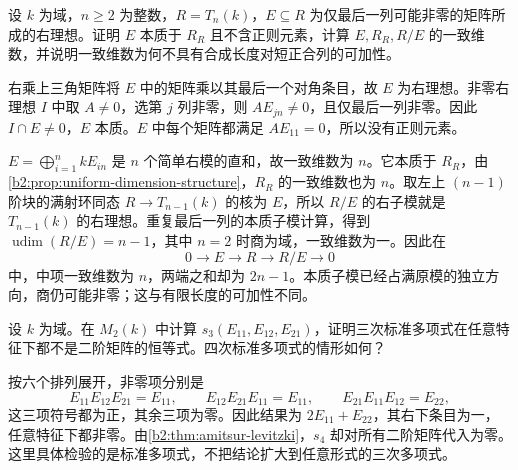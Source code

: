 \begin{optionalexercise}\label{b2:ex:19-essential-without-regular}
	设 \(k\) 为域，\(n\ge2\) 为整数，\(R=T_n(k)\)，\(E\subseteq R\) 为仅最后一列可能非零的矩阵所成的右理想。证明 \(E\) 本质于 \(R_R\) 且不含正则元素，计算 \(E,R_R,R/E\) 的一致维数，并说明一致维数为何不具有合成长度对短正合列的可加性。
\end{optionalexercise}
\begin{solution}
	右乘上三角矩阵将 \(E\) 中的矩阵乘以其最后一个对角条目，故 \(E\) 为右理想。非零右理想 \(I\) 中取 \(A\ne0\)，选第 \(j\) 列非零，则 \(AE_{jn}\ne0\)，且仅最后一列非零。因此 \(I\cap E\ne0\)，\(E\) 本质。\(E\) 中每个矩阵都满足 \(AE_{11}=0\)，所以没有正则元素。

	\(E=\bigoplus_{i=1}^n kE_{in}\) 是 \(n\) 个简单右模的直和，故一致维数为 \(n\)。它本质于 \(R_R\)，由\cref{b2:prop:uniform-dimension-structure}，\(R_R\) 的一致维数也为 \(n\)。取左上 \((n-1)\) 阶块的满射环同态 \(R\to T_{n-1}(k)\) 的核为 \(E\)，所以 \(R/E\) 的右子模就是 \(T_{n-1}(k)\) 的右理想。重复最后一列的本质子模计算，得到 \(\operatorname{udim}(R/E)=n-1\)，其中 \(n=2\) 时商为域，一致维数为一。因此在
	\[
		0\longrightarrow E\longrightarrow R\longrightarrow R/E\longrightarrow0
	\]
	中，中项一致维数为 \(n\)，两端之和却为 \(2n-1\)。本质子模已经占满原模的独立方向，商仍可能非零；这与有限长度的可加性不同。
\end{solution}

\begin{optionalexercise}\label{b2:ex:19-standard-three}
	设 \(k\) 为域。在 \(M_2(k)\) 中计算 \(s_3(E_{11},E_{12},E_{21})\)，证明三次标准多项式在任意特征下都不是二阶矩阵的恒等式。四次标准多项式的情形如何？
\end{optionalexercise}
\begin{solution}
	按六个排列展开，非零项分别是
	\[
		E_{11}E_{12}E_{21}=E_{11},\qquad E_{12}E_{21}E_{11}=E_{11},\qquad E_{21}E_{11}E_{12}=E_{22},
	\]
	这三项符号都为正，其余三项为零。因此结果为 \(2E_{11}+E_{22}\)，其右下条目为一，任意特征下都非零。由\cref{b2:thm:amitsur-levitzki}，\(s_4\) 却对所有二阶矩阵代入为零。这里具体检验的是标准多项式，不把结论扩大到任意形式的三次多项式。
\end{solution}

